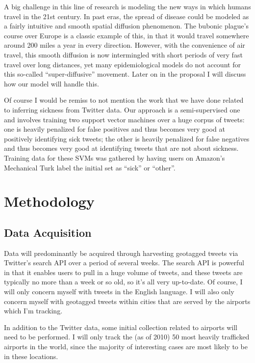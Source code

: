 \documentclass[11pt, letterpaper]{article}
\begin{document}
        A big challenge in this line of research is modeling the new ways in which humans travel in the 21st century. In past eras, the spread of disease could be modeled as a fairly intuitive and smooth spatial diffusion phenomenon. The bubonic plague's course over Europe is a classic example of this, in that it would travel somewhere around 200 miles a year in every direction. \cite{colizza} However, with the convenience of air travel, this smooth diffusion is now intermingled with short periods of very fast travel over long distances, yet many epidemiological models do not account for this so-called ``super-diffusive'' movement. \cite{brockmann} Later on in the proposal I will discuss how our model will handle this.

        Of course I would be remiss to not mention the work that we have done related to inferring sickness from Twitter data. Our approach is a semi-supervised one and involves training two support vector machines over a huge corpus of tweets: one is heavily penalized for false positives and thus becomes very good at positively identifying sick tweets; the other is heavily penalized for false negatives and thus becomes very good at identifying tweets that are not about sickness. Training data for these SVMs was gathered by having users on Amazon's Mechanical Turk label the initial set as ``sick'' or ``other''. \cite{sadilek}

    \section{Methodology}
        \subsection{Data Acquisition}
            Data will predominantly be acquired through harvesting geotagged tweets via Twitter's search API over a period of several weeks. The search API is powerful in that it enables users to pull in a huge volume of tweets, and these tweets are typically no more than a week or so old, so it's all very up-to-date. Of course, I will only concern myself with tweets in the English language. I will also only concern myself with geotagged tweets within cities that are served by the airports which I'm tracking.

            In addition to the Twitter data, some initial collection related to airports will need to be performed. I will only track the (as of 2010) 50 most heavily trafficked airports in the world, since the majority of interesting cases are most likely to be in these locations.
\end{document}

